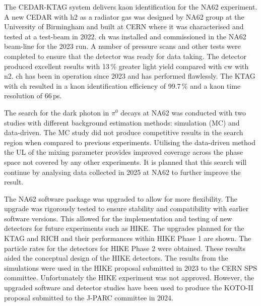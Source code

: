 
The CEDAR-KTAG system delivers kaon identification for the NA62 experiment.
A new \gls{CEDAR} with \gls{h2} as a radiator gas was designed by NA62 group at the University of Birmingham and built at CERN where it was characterised and tested at a test-beam in 2022. 
\gls{ch} was installed and commissioned in the NA62 beam-line for the 2023 run. A number of pressure scans and other tests were completed to ensure that the detector was ready for data taking. 
The detector produced excellent results with 13\,\% greater light yield compared with \gls{cw} with \gls{n2}. \gls{ch} has been in operation since 2023 and has performed flawlessly. The KTAG with \gls{ch} resulted in a kaon identification efficiency of 99.7\,\% and a kaon time resolution of 66\,ps.

The search for the dark photon in $\pi^0$ decays at NA62 was conducted with two studies with different background estimation methods: simulation (MC) and data-driven. The MC study did not produce competitive results in the search region when compared to previous experiments.
Utilising the data-driven method the \gls{UL} of the mixing parameter provides improved coverage across the phase space not covered by any other experiments.
It is planned that this search will continue by analysing data collected in 2025 at NA62 to further improve the result.

The NA62 software package was upgraded to allow for more flexibility. The upgrade was rigorously tested to ensure stability and compatibility with earlier software versions. This allowed for the implementation and testing of new detectors for future experiments such as \gls{HIKE}. The upgrades planned for the KTAG and RICH and their performances within \gls{HIKE} Phase 1 are shown. The 
particle rates for the detectors for \gls{HIKE} Phase 2 were obtained. These results aided the conceptual design of the \gls{HIKE} detectors. The results from the simulations were used in the \gls{HIKE} proposal submitted in 2023 to the CERN SPS committee. Unfortunately the \gls{HIKE} experiment was not approved. However, the upgraded software and detector studies have been used to produce the KOTO-II proposal submitted to the J-PARC committee in 2024. 